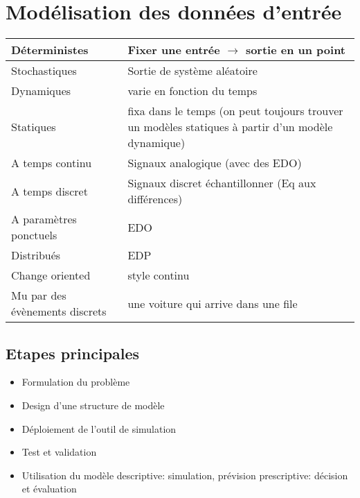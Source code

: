 \documentclass[resume]{subfiles}
\begin{document}
\section{Modélisation des données d'entrée}
\begin{table}[H]
\centering
    \begin{tabular}{|l|l|}
    \hline
Déterministes                  & Fixer une entrée $\rightarrow$ sortie en un point \\
\hline
Stochastiques                  & Sortie de système aléatoire\\
\hline
Dynamiques                     & varie en fonction du temps\\
\hline
Statiques                      & fixa dans le temps (on peut toujours trouver un 
modèles statiques à partir d'un modèle dynamique)\\
\hline
A temps continu                & Signaux analogique (avec des EDO)\\
\hline
A temps discret                & Signaux discret échantillonner (Eq aux 
différences)\\
\hline
A paramètres ponctuels         & EDO\\
\hline
Distribués                     & EDP\\
\hline
Change oriented                & style continu\\
\hline
Mu par des évènements discrets & une voiture qui arrive dans une file\\
 \hline
    \end{tabular}
\end{table}

\subsection{Etapes principales}
\begin{itemize}
\item Formulation du problème
\item Design d'une structure de modèle
\item Déploiement de l'outil de simulation
\item Test et validation
\item Utilisation du modèle
\subitem descriptive: simulation, prévision
\subitem prescriptive: décision et évaluation  
\end{itemize}
\end{document}
